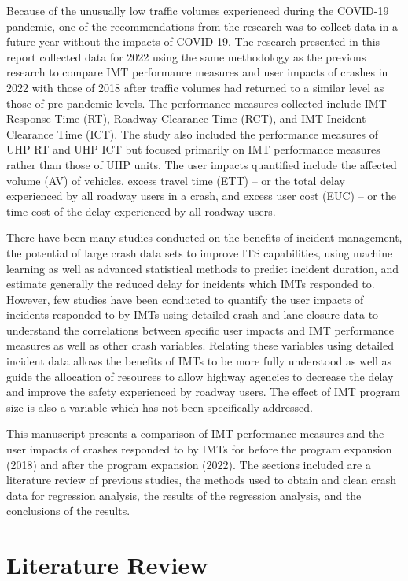 \documentclass[
  letterpaper,
  authoryear]{elsarticle}
\begin{document}
Because of the unusually low traffic volumes experienced during the
COVID-19 pandemic, one of the recommendations from the research was to
collect data in a future year without the impacts of COVID-19. The
research presented in this report collected data for 2022 using the same
methodology as the previous research to compare IMT performance measures
and user impacts of crashes in 2022 with those of 2018 after traffic
volumes had returned to a similar level as those of pre-pandemic levels.
The performance measures collected include IMT Response Time (RT),
Roadway Clearance Time (RCT), and IMT Incident Clearance Time (ICT). The
study also included the performance measures of UHP RT and UHP ICT but
focused primarily on IMT performance measures rather than those of UHP
units. The user impacts quantified include the affected volume (AV) of
vehicles, excess travel time (ETT) -- or the total delay experienced by
all roadway users in a crash, and excess user cost (EUC) -- or the time
cost of the delay experienced by all roadway users.

There have been many studies conducted on the benefits of incident
management, the potential of large crash data sets to improve ITS
capabilities, using machine learning as well as advanced statistical
methods to predict incident duration, and estimate generally the reduced
delay for incidents which IMTs responded to. However, few studies have
been conducted to quantify the user impacts of incidents responded to by
IMTs using detailed crash and lane closure data to understand the
correlations between specific user impacts and IMT performance measures
as well as other crash variables. Relating these variables using
detailed incident data allows the benefits of IMTs to be more fully
understood as well as guide the allocation of resources to allow highway
agencies to decrease the delay and improve the safety experienced by
roadway users. The effect of IMT program size is also a variable which
has not been specifically addressed.

This manuscript presents a comparison of IMT performance measures and
the user impacts of crashes responded to by IMTs for before the program
expansion (2018) and after the program expansion (2022). The sections
included are a literature review of previous studies, the methods used
to obtain and clean crash data for regression analysis, the results of
the regression analysis, and the conclusions of the results.


\section{Literature Review}\label{literature-review}
\end{document}
